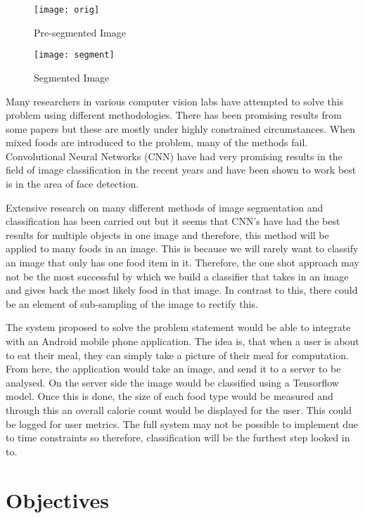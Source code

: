 \begin{figure}
	\texttt{[image: orig]}
	\caption{Pre-segmented Image}
	\label{fig:preImageSeg}
\end{figure}

\begin{figure}
	\texttt{[image: segment]}
	\caption{Segmented Image}
	\label{fig:imageSeg}
\end{figure}


Many researchers in various computer vision labs have attempted to solve this
problem using different methodologies.
There has been promising results from some papers but these are mostly under highly constrained circumstances.
When mixed foods are introduced to the problem, many of the methods fail.
Convolutional Neural Networks (CNN) have had very promising results in the field of image classification in the recent years and have been shown to work best is in the area of face detection.

Extensive research on many different methods of image segmentation and classification has been carried out but it seems that CNN's have had the best results for multiple objects in one image and therefore, this method will be applied to many foods in an image.
This is because we will rarely want to classify an image that only has one food
item in it. Therefore, the one shot approach may not be the most successful by which we
build a classifier that takes in an image and gives back the most likely food in
that image. In contrast to this, there could be an element of sub-sampling of the image to rectify this.

The system proposed to solve the problem statement would be able to integrate with an Android mobile phone application. The idea is, that when a user is about to eat their meal, they can simply take a picture of their meal for computation. From here, the application would take an image, and send it to a server to be analysed.
On the server side the image would be classified using a Tensorflow model.
Once this is done, the size of each food type would be measured and through this an overall calorie count would be displayed for the user. This could be logged for user metrics. The full system may not be possible to implement due to time constraints so therefore, classification will be the furthest step looked in to.

\section{Objectives}
